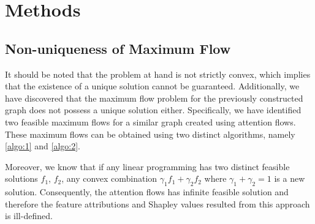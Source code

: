 \documentclass{article} %
\theoremstyle{bfnote}
\newtheorem{theorem}{Theorem}[section]
\newtheorem{definition}[theorem]{Definition}
\newtheorem{observation}[theorem]{Observation}
\begin{document}
\section{Methods}

\subsection{Non-uniqueness of Maximum Flow}
%
%
%

It should be noted that the problem at hand is not strictly convex, which implies that the existence of a unique solution cannot be guaranteed. Additionally, we have discovered that the maximum flow problem for the previously constructed graph does not possess a unique solution either. Specifically, we have identified two feasible maximum flows for a similar graph created using attention flows. These maximum flows can be obtained using two distinct algorithms, namely \cref{algo:1} and \cref{algo:2}.


Moreover, we know that if any linear programming has two distinct feasible solutions $f_1$, $f_2$, any convex combination $\gamma_1 f_1 + \gamma_2 f_2$ where $\gamma_1+\gamma_2=1$ is a new solution. Consequently, the attention flows has infinite feasible solution and therefore the feature attributions and Shapley values resulted from this approach is ill-defined.  


\end{document}
